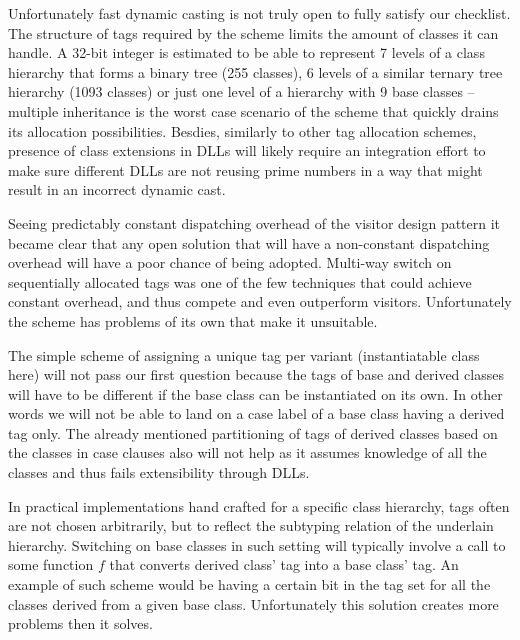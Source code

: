 \documentclass[preprint]{sigplanconf}
\begin{document}
Unfortunately fast dynamic casting is not truly open to fully satisfy our 
checklist. The structure of tags required by the scheme limits the amount of 
classes it can handle. A 32-bit integer is estimated to be able to represent 7 
levels of a class hierarchy that forms a binary tree (255 classes), 6 levels of 
a similar ternary tree hierarchy (1093 classes) or just one level of a hierarchy 
with 9 base classes -- multiple inheritance is the worst case scenario of the 
scheme that quickly drains its allocation possibilities. Besdies, similarly to 
other tag allocation schemes, presence of class extensions in DLLs will likely 
require an integration effort to make sure different DLLs are not reusing prime 
numbers in a way that might result in an incorrect dynamic cast.

Seeing predictably constant dispatching overhead of the visitor design pattern 
it became clear that any open solution that will have a non-constant dispatching 
overhead will have a poor chance of being adopted. Multi-way switch on 
sequentially allocated tags\cite{Spuler94} was one of the few techniques that 
could achieve constant overhead, and thus compete and even outperform visitors. 
Unfortunately the scheme has problems of its own that make it unsuitable.



The simple scheme of assigning a unique tag per variant (instantiatable class 
here) will not pass our first question because the tags of base and derived 
classes will have to be different if the base class can be instantiated on its 
own. In other words we will not be able to land on a case label of a base class 
having a derived tag only. The already mentioned partitioning of tags of derived 
classes based on the classes in case clauses also will not help as it assumes 
knowledge of all the classes and thus fails extensibility through DLLs.

In practical implementations hand crafted for a specific class hierarchy, tags 
often are not chosen arbitrarily, but to reflect the subtyping relation of the 
underlain hierarchy. Switching on base classes in such setting will typically 
involve a call to some function $f$ that converts derived class' tag into a base 
class' tag. An example of such scheme would be having a certain bit in the tag 
set for all the classes derived from a given base class. Unfortunately this 
solution creates more problems then it solves.
\end{document}
